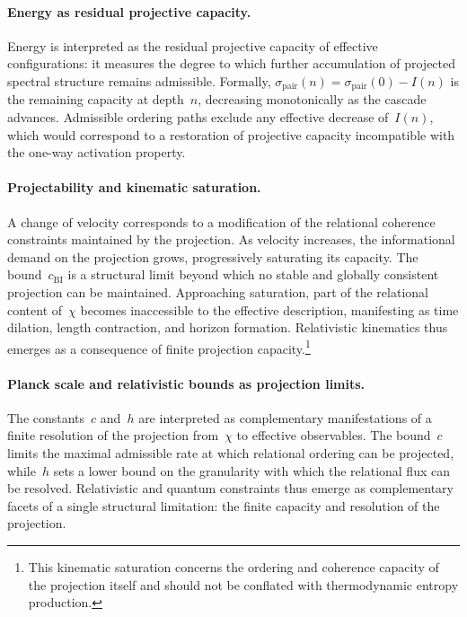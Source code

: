   \paragraph{Energy as residual projective capacity.}
    Energy is interpreted as the residual projective capacity of effective
    configurations: it measures the degree to which further accumulation of
    projected spectral structure remains admissible.
    Formally, $\sigma_{\mathrm{pair}}(n) = \sigma_{\mathrm{pair}}(0) - I(n)$
    is the remaining capacity at depth~$n$, decreasing monotonically as the
    cascade advances.
    Admissible ordering paths exclude any effective decrease of~$I(n)$, which
    would correspond to a restoration of projective capacity incompatible with
    the one-way activation property.

  \paragraph{Projectability and kinematic saturation.}
    \label{par:projectability-kinematics}
    A change of velocity corresponds to a modification of the relational
    coherence constraints maintained by the projection.
    As velocity increases, the informational demand on the projection grows,
    progressively saturating its capacity.
    The bound~$c_{\mathrm{BI}}$ is a structural limit beyond which no stable and
    globally consistent projection can be maintained.
    Approaching saturation, part of the relational content of~$\chi$ becomes
    inaccessible to the effective description, manifesting as time dilation,
    length contraction, and horizon formation.
    Relativistic kinematics thus emerges as a consequence of finite projection
    capacity.\footnote{%
  This kinematic saturation concerns the ordering and coherence capacity of
  the projection itself and should not be conflated with thermodynamic entropy
  production.}

  \paragraph{Planck scale and relativistic bounds as projection limits.}
    \label{par:planck-c-projective-limits}
    The constants~$c$ and~$h$ are interpreted as complementary manifestations of
    a finite resolution of the projection from~$\chi$ to effective observables.
    The bound~$c$ limits the maximal admissible rate at which relational ordering
    can be projected, while~$h$ sets a lower bound on the granularity with which
    the relational flux can be resolved.
    Relativistic and quantum constraints thus emerge as complementary facets of
    a single structural limitation: the finite capacity and resolution of the
    projection.
